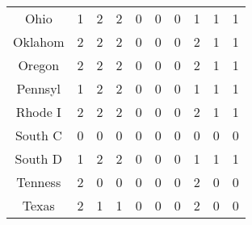 \begin{longtable}{cp{1.5cm}p{1.5cm}p{1.5cm}p{1.5cm}p{1.5cm}p{1.5cm}p{1.5cm}p{1.5cm}p{1.5cm}}
Ohio    &                          1 &                             2 &                          2 &                        0 &                           0 &                        0 &                         1 &                            1 &                         1 \\
Oklahom &                          2 &                             2 &                          2 &                        0 &                           0 &                        0 &                         2 &                            1 &                         1 \\
Oregon  &                          2 &                             2 &                          2 &                        0 &                           0 &                        0 &                         2 &                            1 &                         1 \\
Pennsyl &                          1 &                             2 &                          2 &                        0 &                           0 &                        0 &                         1 &                            1 &                         1 \\
Rhode I &                          2 &                             2 &                          2 &                        0 &                           0 &                        0 &                         2 &                            1 &                         1 \\
South C &                          0 &                             0 &                          0 &                        0 &                           0 &                        0 &                         0 &                            0 &                         0 \\
South D &                          1 &                             2 &                          2 &                        0 &                           0 &                        0 &                         1 &                            1 &                         1 \\
Tenness &                          2 &                             0 &                          0 &                        0 &                           0 &                        0 &                         2 &                            0 &                         0 \\
Texas   &                          2 &                             1 &                          1 &                        0 &                           0 &                        0 &                         2 &                            0 &                         0 \\

\end{longtable}
